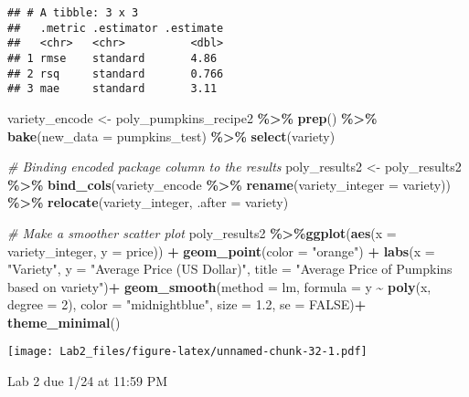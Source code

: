 \documentclass[
]{article}
\newenvironment{Shaded}{\begin{snugshade}}{\end{snugshade}}
\newcommand{\AttributeTok}[1]{\textcolor[rgb]{0.13,0.29,0.53}{#1}}
\newcommand{\CommentTok}[1]{\textcolor[rgb]{0.56,0.35,0.01}{\textit{#1}}}
\newcommand{\ConstantTok}[1]{\textcolor[rgb]{0.56,0.35,0.01}{#1}}
\newcommand{\DecValTok}[1]{\textcolor[rgb]{0.00,0.00,0.81}{#1}}
\newcommand{\FloatTok}[1]{\textcolor[rgb]{0.00,0.00,0.81}{#1}}
\newcommand{\FunctionTok}[1]{\textcolor[rgb]{0.13,0.29,0.53}{\textbf{#1}}}
\newcommand{\NormalTok}[1]{#1}
\newcommand{\OtherTok}[1]{\textcolor[rgb]{0.56,0.35,0.01}{#1}}
\newcommand{\SpecialCharTok}[1]{\textcolor[rgb]{0.81,0.36,0.00}{\textbf{#1}}}
\newcommand{\StringTok}[1]{\textcolor[rgb]{0.31,0.60,0.02}{#1}}
\begin{document}
\begin{verbatim}
## # A tibble: 3 x 3
##   .metric .estimator .estimate
##   <chr>   <chr>          <dbl>
## 1 rmse    standard       4.86 
## 2 rsq     standard       0.766
## 3 mae     standard       3.11
\end{verbatim}

\begin{Shaded}
\begin{Highlighting}[]
\NormalTok{variety\_encode }\OtherTok{\textless{}{-}}\NormalTok{ poly\_pumpkins\_recipe2 }\SpecialCharTok{\%\textgreater{}\%} 
  \FunctionTok{prep}\NormalTok{() }\SpecialCharTok{\%\textgreater{}\%} 
  \FunctionTok{bake}\NormalTok{(}\AttributeTok{new\_data =}\NormalTok{ pumpkins\_test) }\SpecialCharTok{\%\textgreater{}\%} 
  \FunctionTok{select}\NormalTok{(variety)}

\CommentTok{\# Binding encoded package column to the results}
\NormalTok{poly\_results2 }\OtherTok{\textless{}{-}}\NormalTok{ poly\_results2 }\SpecialCharTok{\%\textgreater{}\%} 
  \FunctionTok{bind\_cols}\NormalTok{(variety\_encode }\SpecialCharTok{\%\textgreater{}\%} 
              \FunctionTok{rename}\NormalTok{(}\AttributeTok{variety\_integer =}\NormalTok{ variety)) }\SpecialCharTok{\%\textgreater{}\%} 
  \FunctionTok{relocate}\NormalTok{(variety\_integer, }\AttributeTok{.after =}\NormalTok{ variety)}


\CommentTok{\# Make a smoother scatter plot }
\NormalTok{poly\_results2 }\SpecialCharTok{\%\textgreater{}\%}\FunctionTok{ggplot}\NormalTok{(}\FunctionTok{aes}\NormalTok{(}\AttributeTok{x =}\NormalTok{ variety\_integer, }\AttributeTok{y =}\NormalTok{ price)) }\SpecialCharTok{+}
  \FunctionTok{geom\_point}\NormalTok{(}\AttributeTok{color =} \StringTok{"orange"}\NormalTok{) }\SpecialCharTok{+}
  \FunctionTok{labs}\NormalTok{(}\AttributeTok{x =} \StringTok{"Variety"}\NormalTok{, }\AttributeTok{y =} \StringTok{"Average Price (US Dollar)"}\NormalTok{, }\AttributeTok{title =} \StringTok{"Average Price of Pumpkins based on variety"}\NormalTok{)}\SpecialCharTok{+}
   \FunctionTok{geom\_smooth}\NormalTok{(}\AttributeTok{method =}\NormalTok{ lm, }\AttributeTok{formula =}\NormalTok{ y }\SpecialCharTok{\textasciitilde{}} \FunctionTok{poly}\NormalTok{(x, }\AttributeTok{degree =} \DecValTok{2}\NormalTok{), }\AttributeTok{color =} \StringTok{"midnightblue"}\NormalTok{, }\AttributeTok{size =} \FloatTok{1.2}\NormalTok{, }\AttributeTok{se =} \ConstantTok{FALSE}\NormalTok{)}\SpecialCharTok{+}
  \FunctionTok{theme\_minimal}\NormalTok{()}
\end{Highlighting}
\end{Shaded}

\texttt{[image: Lab2\_files/figure-latex/unnamed-chunk-32-1.pdf]}

Lab 2 due 1/24 at 11:59 PM
\end{document}
